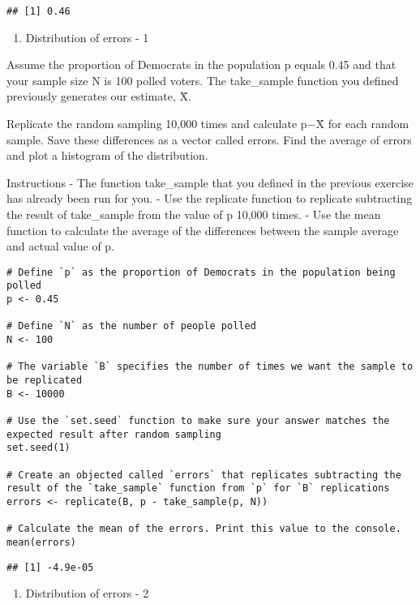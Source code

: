 \documentclass[
]{article}
\providecommand{\tightlist}{%
  \setlength{\itemsep}{0pt}\setlength{\parskip}{0pt}}
\begin{document}
\begin{verbatim}
## [1] 0.46
\end{verbatim}

\begin{enumerate}
\def\labelenumi{\arabic{enumi}.}
\setcounter{enumi}{1}
\tightlist
\item
  Distribution of errors - 1
\end{enumerate}

Assume the proportion of Democrats in the population p equals 0.45 and
that your sample size N is 100 polled voters. The take\_sample function
you defined previously generates our estimate, X̄.

Replicate the random sampling 10,000 times and calculate p−X̄ for each
random sample. Save these differences as a vector called errors. Find
the average of errors and plot a histogram of the distribution.

Instructions - The function take\_sample that you defined in the
previous exercise has already been run for you. - Use the replicate
function to replicate subtracting the result of take\_sample from the
value of p 10,000 times. - Use the mean function to calculate the
average of the differences between the sample average and actual value
of p.~

\begin{verbatim}
# Define `p` as the proportion of Democrats in the population being polled
p <- 0.45

# Define `N` as the number of people polled
N <- 100

# The variable `B` specifies the number of times we want the sample to be replicated
B <- 10000

# Use the `set.seed` function to make sure your answer matches the expected result after random sampling
set.seed(1)

# Create an objected called `errors` that replicates subtracting the result of the `take_sample` function from `p` for `B` replications
errors <- replicate(B, p - take_sample(p, N))

# Calculate the mean of the errors. Print this value to the console.
mean(errors)
\end{verbatim}

\begin{verbatim}
## [1] -4.9e-05
\end{verbatim}

\begin{enumerate}
\def\labelenumi{\arabic{enumi}.}
\setcounter{enumi}{2}
\tightlist
\item
  Distribution of errors - 2
\end{enumerate}
\end{document}
